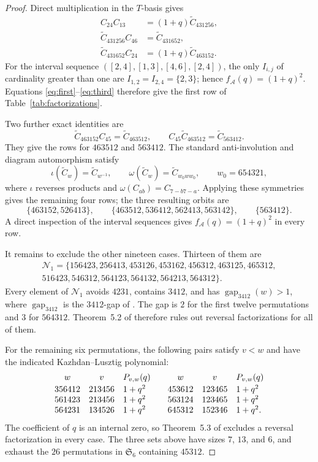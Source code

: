 \documentclass[11pt]{amsart}
\theoremstyle{remark}
\newcommand{\Ssix}{\mathfrak S_6}
\newcommand{\Ct}{\widetilde C}
\newcommand{\Cab}[2]{C_{#1#2}}
\newcommand{\gap}{\operatorname{gap}_{3412}}
\begin{document}
\begin{proof}
Direct multiplication in the $T$-basis gives
\begin{align}
\Cab{2}{4}\Cab{1}{3}
  &=(1+q)\Ct_{431256},\label{eq:first}\\
\Ct_{431256}\Cab{4}{6}
  &=\Ct_{431652},\label{eq:second}\\
\Ct_{431652}\Cab{2}{4}
  &=(1+q)\Ct_{463152}.
\label{eq:third}
\end{align}
For the interval sequence
$([2,4],[1,3],[4,6],[2,4])$, the only $I_{i,j}$ of cardinality greater
than one are
$I_{1,2}=I_{2,4}=\{2,3\}$; hence
$f_{\mathcal A}(q)=(1+q)^2$. Equations
\eqref{eq:first}--\eqref{eq:third} therefore give the first row of
Table~\ref{tab:factorizations}.

Two further exact identities are
\[
\Ct_{463152}\Cab{4}{5}=\Ct_{463512},
\qquad
\Cab{4}{5}\Ct_{463512}=\Ct_{563412}.
\]
They give the rows for $463512$ and $563412$. The standard
anti-involution and diagram automorphism satisfy
\[
\iota(\Ct_w)=\Ct_{w^{-1}},
\qquad
\omega(\Ct_w)=\Ct_{w_0ww_0},
\qquad w_0=654321,
\]
where $\iota$ reverses products and
$\omega(\Cab{a}{b})=\Cab{7-b}{7-a}$. Applying these symmetries gives
the remaining four rows; the three resulting orbits are
\[
\{463152,526413\},\qquad
\{463512,536412,562413,563142\},\qquad
\{563412\}.
\]
A direct inspection of the interval sequences gives
$f_{\mathcal A}(q)=(1+q)^2$ in every row.

It remains to exclude the other nineteen cases. Thirteen of them are
\begin{multline*}
\mathcal N_1=\{156423,256413,453126,453162,456312,463125,465312,\\
516423,546312,564123,564132,564213,564312\}.
\end{multline*}
Every element of $\mathcal N_1$ avoids $4231$, contains $3412$, and has
$\gap(w)>1$, where $\gap$ is the $3412$-gap of
\cite[Sec.~5]{ParisiEtAl}. The gap is $2$ for the first twelve
permutations and $3$ for $564312$. Theorem~5.2 of
\cite{ParisiEtAl} therefore rules out reversal factorizations for all
of them.

For the remaining six permutations, the following pairs satisfy
$v<w$ and have the indicated Kazhdan--Lusztig polynomial:
\[
\begin{array}{ccl@{\qquad}ccl}
 w&v&P_{v,w}(q)&w&v&P_{v,w}(q)\\[2pt]
356412&213456&1+q^2&453612&123465&1+q^2\\
561423&213456&1+q^2&563124&123465&1+q^2\\
564231&134526&1+q^2&645312&152346&1+q^2.
\end{array}
\]
The coefficient of $q$ is an internal zero, so Theorem~5.3 of
\cite{ParisiEtAl} excludes a reversal factorization in every case.
The three sets above have sizes $7$, $13$, and $6$, and exhaust the
$26$ permutations in $\Ssix$ containing $45312$.


\end{proof}
\end{document}
